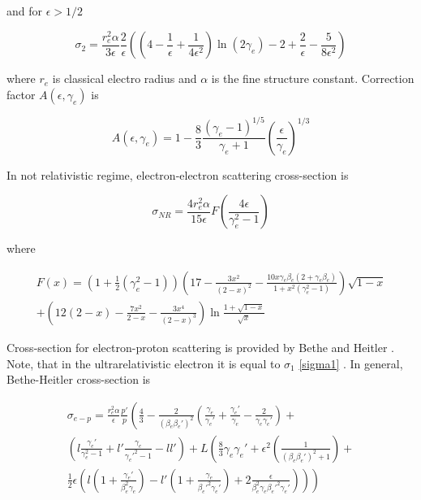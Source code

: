 and for $\epsilon > 1/2$

\begin{equation}
	\sigma_2 = \frac{r_e^2\alpha}{3\epsilon}\frac{2}{\epsilon}\left(\left(4-\frac{1}{\epsilon}+\frac{1}{4\epsilon^2}\right)\ln\left(2\gamma_e\right)-2+\frac{2}{\epsilon}-\frac{5}{8\epsilon^2}\right)
\end{equation}

where $r_e$ is classical electro radius and $\alpha$ is the fine structure constant. Correction factor $A(\epsilon, \gamma_e)$ is

\begin{equation}
	A\left(\epsilon, \gamma_e\right)=1-\frac{8}{3}\frac{\left(\gamma_e-1\right)^{1/5}}{\gamma_e + 1}\left(\frac{\epsilon}{\gamma_e}\right)^{1/3}
\end{equation}

In not relativistic regime, electron-electron scattering cross-section is 

\begin{equation}
	\sigma_{NR}=\frac{4r_e^2\alpha}{15\epsilon}F\left(\frac{4\epsilon}{\gamma_e^2-1}\right)
\end{equation}

where

\begin{equation}
	\begin{split}
	F(x) = \left(1+\frac{1}{2}\left(\gamma_e^2-1\right)\right)\left(17-\frac{3x^2}{\left(2-x\right)^2}-\frac{10x\gamma_e\beta_e\left(2+\gamma_e\beta_e\right)}{1+x^2\left(\gamma_e^2-1\right)}\right)\sqrt{1-x} \\ +\left(12\left(2-x\right)-\frac{7x^2}{2-x}-\frac{3x^4}{\left(2-x\right)^3}\right)\ln\frac{1+\sqrt{1-x}}{\sqrt{x}}
	\end{split}
\end{equation}

Cross-section for electron-proton scattering is provided by Bethe and Heitler \cite{BetheHeitler}. Note, that in the ultrarelativistic electron it is equal to $\sigma_1$ \ref{sigma1} \cite{JauchRohrlich}. In general, Bethe-Heitler cross-section is

\begin{equation}
	\begin{split}
	\sigma_{e-p} = \frac{r_e^2\alpha}{\epsilon}\frac{p'}{p}\left(\frac{4}{3}-\frac{2}{\left(\beta_e\beta_e'\right)^2}\left(\frac{\gamma_e}{\gamma_e'}+\frac{\gamma_e'}{\gamma_e}-\frac{2}{\gamma_e\gamma_e'}\right) + \right. \\ \left. \left(l\frac{\gamma_e'}{\gamma_e^2-1}+l'\frac{\gamma_e}{\gamma_e'^2-1}-l l'\right) + L\left(\frac{8}{3}\gamma_e\gamma_e'+\epsilon^2\left(\frac{1}{\left(\beta_e\beta_e'\right)^2+1}\right)+ \right. \right. \\ \left. \left. \frac{1}{2}\epsilon\left(l\left(1+\frac{\gamma_e'}{\beta_e^2\gamma_e}\right)-l'\left(1+\frac{\gamma_e}{\beta_e'^2\gamma_e'}\right)+2\frac{\epsilon}{\beta_e^2\gamma_e\beta_e'^2\gamma_e'}\right)\right)\right)
	\end{split}
\end{equation}

